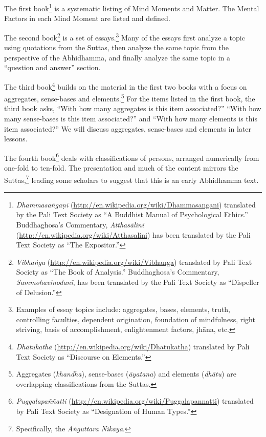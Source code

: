 The first book\footnote{\textit{Dhammasaṅgaṇī} (\url{http://en.wikipedia.org/wiki/Dhammasangani}) translated by the Pali Text Society as “A Buddhist Manual of Psychological Ethics.” Buddhaghosa’s Commentary, \textit{Atthasālinī} (\url{http://en.wikipedia.org/wiki/Atthasalini}) has been translated by the Pali Text Society as “The Expositor.”} is a systematic listing of Mind Moments and Matter. The Mental Factors in each Mind Moment are listed and defined. 

The second book\footnote{\textit{Vibhaṅga} (\url{http://en.wikipedia.org/wiki/Vibhanga}) translated by Pali Text Society as “The Book of Analysis.” Buddhaghosa’s Commentary, \textit{Sammohavinodanī}, has been translated by the Pali Text Society as “Dispeller of Delusion.”} is a set of essays.\footnote{Examples of essay topics include: aggregates, bases, elements, truth, controlling faculties, dependent origination, foundation of mindfulness, right striving, basis of accomplishment, enlightenment factors, jhāna, etc.} Many of the essays first analyze a topic using quotations from the Suttas, then analyze the same topic from the perspective of the Abhidhamma, and finally analyze the same topic in a “question and answer” section.

\pagebreak

The third book\footnote{\textit{Dhātukathā} (\url{http://en.wikipedia.org/wiki/Dhatukatha}) translated by Pali Text Society as “Discourse on Elements.”} builds on the material in the first two books with a focus on aggregates, sense-bases and elements.\footnote{Aggregates (\textit{khandha}), sense-bases (\textit{āyatana}) and elements (\textit{dhātu}) are overlapping classifications from the Suttas.} For the items listed in the first book, the third book asks, “With how many aggregates is this item associated?” “With how many sense-bases is this item associated?” and “With how many elements is this item associated?” We will discuss aggregates, sense-bases and elements in later lessons.

The fourth book\footnote{\textit{Puggalapaññatti} (\url{http://en.wikipedia.org/wiki/Puggalapannatti}) translated by Pali Text Society as “Designation of Human Types.”} deals with classifications of persons, arranged numerically from one-fold to ten-fold. The presentation and much of the content mirrors the Suttas,\footnote{Specifically, the \textit{Aṅguttara Nikāya}.} leading some scholars to suggest that this is an early Abhidhamma text.

